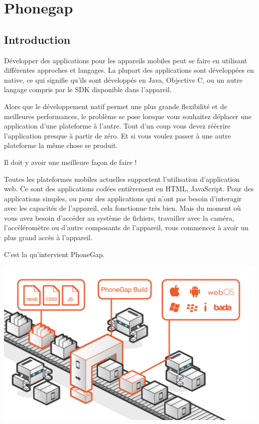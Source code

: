 \section{Phonegap}
\label{ch:phonegap}

\subsection{Introduction}

Développer des applications pour les appareils mobiles peut se faire en utilisant différentes approches et langages. La plupart des applications sont développées en native, ce qui signifie qu’ils sont développés en Java, Objective C, ou un autre langage compris par le SDK disponible dans l’appareil.

Alors que le développement natif permet une plus grande flexibilité et de meilleures performances, le problème se pose lorsque vous souhaitez déplacer une application d’une plateforme à l’autre. Tout d’un coup vous devez réécrire l’application presque à partir de zéro. Et si vous voulez passer à une autre plateforme la même chose se produit.

Il doit y avoir une meilleure façon de faire !

Toutes les plateformes mobiles actuelles supportent l’utilisation d’application web. Ce sont des applications codées entièrement en HTML, JavaScript. Pour des applications simples, ou pour des applications qui n’ont pas besoin d’interagir avec les capacités de l’appareil, cela fonctionne très bien. Mais du moment où vous avez besoin d’accéder au système de fichiers, travailler avec la caméra, l’accéléromètre ou d’autre composants de l’appareil, vous commencez à avoir un plus grand accès à l’appareil.

C’est la qu’intervient PhoneGap.


\begin{center}
\includegraphics[width=14cm]{img/phonegap.png}
\label{Plateforme phonegap}
\end{center}


